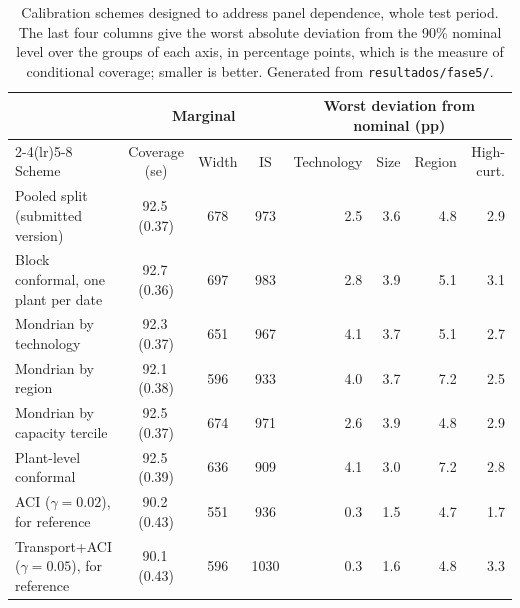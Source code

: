 \begin{table}[t]
\centering
\footnotesize
\caption{Calibration schemes designed to address panel dependence, whole test period. The last four columns give the worst absolute deviation from the 90\% nominal level over the groups of each axis, in percentage points, which is the measure of conditional coverage; smaller is better. Generated from \texttt{resultados/fase5/}.}
\label{tab:panel}
\begin{tabular}{lcccrrrr}
\toprule
 & \multicolumn{3}{c}{Marginal} & \multicolumn{4}{c}{Worst deviation from nominal (pp)} \\
\cmidrule(lr){2-4}\cmidrule(lr){5-8}
Scheme & Coverage (se) & Width & $\mathrm{IS}$ & Technology & Size & Region & High-curt. \\
\midrule
Pooled split (submitted version) & 92.5\,(0.37) & 678 & 973 & 2.5 & 3.6 & 4.8 & 2.9 \\
Block conformal, one plant per date & 92.7\,(0.36) & 697 & 983 & 2.8 & 3.9 & 5.1 & 3.1 \\
Mondrian by technology & 92.3\,(0.37) & 651 & 967 & 4.1 & 3.7 & 5.1 & 2.7 \\
Mondrian by region & 92.1\,(0.38) & 596 & 933 & 4.0 & 3.7 & 7.2 & 2.5 \\
Mondrian by capacity tercile & 92.5\,(0.37) & 674 & 971 & 2.6 & 3.9 & 4.8 & 2.9 \\
Plant-level conformal & 92.5\,(0.39) & 636 & 909 & 4.1 & 3.0 & 7.2 & 2.8 \\
ACI ($\gamma{=}0.02$), for reference & 90.2\,(0.43) & 551 & 936 & 0.3 & 1.5 & 4.7 & 1.7 \\
Transport+ACI ($\gamma{=}0.05$), for reference & 90.1\,(0.43) & 596 & 1030 & 0.3 & 1.6 & 4.8 & 3.3 \\
\bottomrule
\end{tabular}
\end{table}
